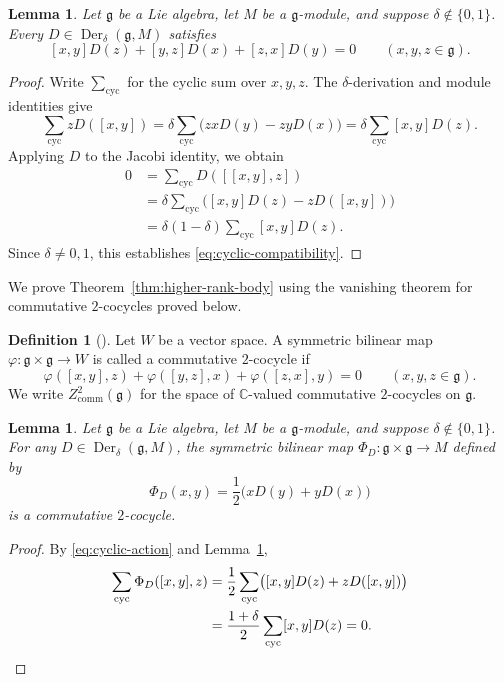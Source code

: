 \documentclass[11pt,reqno]{amsart}
\numberwithin{equation}{section}
\newcommand{\C}{\mathbb C}
\newcommand{\g}{\mathfrak g}
\DeclareMathOperator{\Der}{Der}
\newtheorem{lemma}[theorem]{Lemma}
\theoremstyle{definition}
\newtheorem{definition}[theorem]{Definition}
\theoremstyle{remark}
\begin{document}
\begin{lemma}\label{lem:cyclic-compatibility}
Let \(\g\) be a Lie algebra, let \(M\) be a \(\g\)-module,
and suppose \(\delta\notin\{0,1\}\).
Every \(D\in\Der_\delta(\g,M)\) satisfies
\begin{equation}\label{eq:cyclic-compatibility}
[x,y]D(z)+[y,z]D(x)+[z,x]D(y)=0
\qquad(x,y,z\in\g).
\end{equation}
\end{lemma}
\begin{proof}
Write \(\sum_{\mathrm{cyc}}\) for the cyclic sum over \(x,y,z\).
The \(\delta\)-derivation and module identities give
\begin{equation}\label{eq:cyclic-action}
\sum_{\mathrm{cyc}}zD([x,y])
=\delta\sum_{\mathrm{cyc}}\bigl(zxD(y)-zyD(x)\bigr)
=\delta\sum_{\mathrm{cyc}}[x,y]D(z).
\end{equation}
Applying \(D\) to the Jacobi identity, we obtain
\[
\begin{aligned}
0
&=\sum_{\mathrm{cyc}}D([[x,y],z])\\
&=\delta\sum_{\mathrm{cyc}}
  \bigl([x,y]D(z)-zD([x,y])\bigr)\\
&=\delta(1-\delta)\sum_{\mathrm{cyc}}[x,y]D(z).
\end{aligned}
\]
Since \(\delta\ne0,1\), this establishes \eqref{eq:cyclic-compatibility}.
\end{proof}

We prove Theorem~\ref{thm:higher-rank-body} using the vanishing theorem
for commutative \(2\)-cocycles proved below.

\begin{definition}[{\cite{DZ10}}]
Let \(W\) be a vector space. A symmetric bilinear map
\(\varphi:\g\times \g\to W\) is called a commutative
\(2\)-cocycle if
\[
\varphi([x,y],z)+\varphi([y,z],x)+\varphi([z,x],y)=0
\qquad(x,y,z\in \g).
\]
We write \(Z^2_{\mathrm{comm}}(\g)\) for the space of
\(\C\)-valued commutative \(2\)-cocycles on \(\g\).
\end{definition}

\begin{lemma}\label{lem:comm-from-delta}
Let \(\g\) be a Lie algebra, let \(M\) be a \(\g\)-module,
and suppose \(\delta\notin\{0,1\}\).
For any \(D\in\Der_\delta(\g,M)\), the symmetric bilinear map
\(\Phi_D:\g\times \g\to M\) defined by
\begin{equation}\label{eq:Phi}
\Phi_D(x,y)=\frac{1}{2}\bigl(xD(y)+yD(x)\bigr)
\end{equation}
is a commutative \(2\)-cocycle.
\end{lemma}
\begin{proof}
By \eqref{eq:cyclic-action} and
Lemma~\ref{lem:cyclic-compatibility},
\[
\begin{aligned}
\sum_{\mathrm{cyc}}\Phi_D([x,y],z)
&=\frac{1}{2}\sum_{\mathrm{cyc}}
  \bigl([x,y]D(z)+zD([x,y])\bigr)\\
&=\frac{1+\delta}{2}\sum_{\mathrm{cyc}}[x,y]D(z)=0.
\end{aligned}\qedhere
\]
\end{proof}
\end{document}
